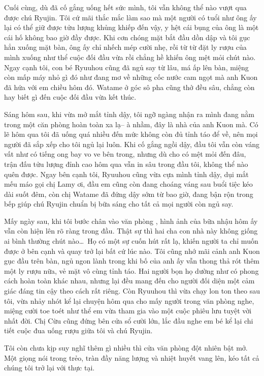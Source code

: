\documentclass[../main.tex]{subfiles}
\begin{document}
Cuối cùng, dù đã cố gắng uống hết sức mình, tôi vẫn không thể nào vượt qua được chú Ryujin. Tôi cứ mãi thắc mắc làm sao mà một người có tuổi như ông ấy lại có thể giữ được tửu lượng khủng khiếp đến vậy, y hệt cái bụng của ông là một cái hố không bao giờ đầy được. Khi cơn chóng mặt bắt đầu dồn dập và tôi gục hẳn xuống mặt bàn, ông ấy chỉ nhếch mép cười nhẹ, rồi từ từ đặt ly rượu của mình xuống như thể cuộc đối đầu vừa rồi chẳng hề khiến ông mệt mỏi chút nào. Ngay cạnh tôi, con bé Ryuuhou cũng đã ngủ say từ lâu, má ấp lên bàn, miệng còn mấp máy nhỏ gì đó như đang mơ về những cốc nước cam ngọt mà anh Kuon đã hứa với em chiều hôm đó. Watame ở góc sô pha cũng thở đều sâu, chẳng còn hay biết gì đến cuộc đối đầu vừa kết thúc.

\il

Sáng hôm sau, khi vừa mở mắt tỉnh dậy, tôi ngỡ ngàng nhận ra mình đang nằm trong một căn phòng hoàn toàn xa lạ-- à nhầm, đây là nhà của anh Kuon mà. Có lẽ hôm qua tôi đã uống quá nhiều đến mức không còn đủ tỉnh táo để về, nên mọi người đã sắp xếp cho tôi ngủ lại luôn. Khi cố gắng ngồi dậy, đầu tôi vẫn còn váng vất như có tiếng ong bay vo ve bên trong, nhưng dù cho có mệt mỏi đến đâu, trận đấu tửu lượng đỉnh cao hôm qua vẫn in sâu trong đầu tôi, không thể nào quên được. Ngay bên cạnh tôi, Ryuuhou cũng vừa cựa mình tỉnh dậy, dụi mắt mếu máo gọi chị Lamy ơi, đầu em cũng còn đang choáng váng sau buổi tiệc kéo dài suốt đêm, còn chị Watame đã đứng dậy sớm từ bao giờ, đang bận rộn trong bếp giúp chú Ryujin chuẩn bị bữa sáng cho tất cả mọi người còn ngủ say.

Mấy ngày sau, khi tôi bước chân vào văn phòng \hll, hình ảnh của bữa nhậu hôm ấy vẫn còn hiện lên rõ ràng trong đầu. Thật sự thì hai cha con nhà này không giống ai bình thường chút nào\dots\ Họ có một sự cuốn hút rất lạ, khiến người ta chỉ muốn được ở bên cạnh và quay trở lại bất cứ lúc nào. Tôi cũng nhớ mãi cảnh anh Kuon gục đầu trên bàn, ngủ ngon lành trong khi bố của anh ấy vẫn thong thả rót thêm một ly rượu nữa, vẻ mặt vô cùng tỉnh táo. Hai người bọn họ dường như có phong cách hoàn toàn khác nhau, nhưng lại đều mang đến cho người đối diện một cảm giác đáng tin cậy theo cách rất riêng. Còn Ryuuhou thì vừa chạy lon ton theo sau tôi, vừa nhảy nhót kể lại chuyện hôm qua cho mấy người trong văn phòng nghe, miệng cười toe toét như thể em vừa tham gia vào một cuộc phiêu lưu tuyệt vời nhất đời. Chị Cừu cũng đứng bên cửa sổ cười lớn, lắc đầu nghe em bé kể lại chi tiết cuộc đua uống rượu giữa tôi và chú Ryujin.

Tôi còn chưa kịp suy nghĩ thêm gì nhiều thì cửa văn phòng đột nhiên bật mở. Một giọng nói trong trẻo, tràn đầy năng lượng và nhiệt huyết vang lên, kéo tất cả chúng tôi trở lại với thực tại.
\end{document}
